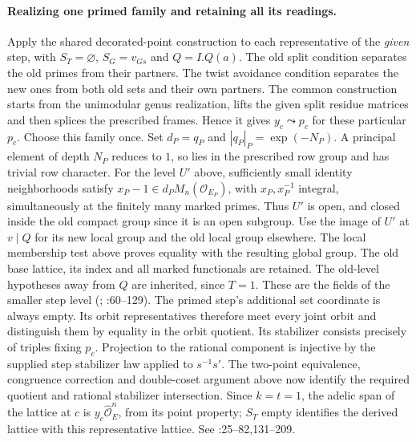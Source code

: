 \paragraph{Realizing one primed family and retaining all its readings.}\label{r13:s9-shrink}
Apply the shared decorated-point construction
 to each representative of the
\emph{given} step, with $S_T=\varnothing$, $S_G=v_{Gs}$ and $Q=I.Q(a)$.
The old split condition separates the old primes from their partners.
The twist avoidance condition separates the new ones from both old
sets and their own partners. The common construction starts from the
unimodular genus realization, lifts the given split residue matrices
and then splices the prescribed frames. Hence it gives
$y_c\leadsto p_c$ for these particular $p_c$. Choose this family once.
Set $d_P=q_P$ and $|q_P|_P=\exp(-N_P)$. A principal element of depth
$N_P$ reduces to $1$, so lies in the prescribed row group and has
trivial row character. For the level $U'$ above, sufficiently small
identity neighborhoods satisfy $x_P-1\in d_PM_n(\mathcal O_{E_P})$,
with $x_P,x_P^{-1}$ integral, simultaneously at the finitely many
marked primes. Thus $U'$ is open, and closed inside the old compact
group since it is an open subgroup. Use the image of $U'$ at $v\mid Q$
for its new local group and the old local group elsewhere. The local
membership test above proves equality with the resulting global group.
The old base lattice, its index and all marked functionals are retained.
The old-level hypotheses away from $Q$ are inherited, since $T=1$.
These are the fields of the smaller step level
(;
:60--129).
The primed step's additional set coordinate is always empty. Its
orbit representatives therefore meet every joint orbit and distinguish
them by equality in the orbit quotient. Its stabilizer consists precisely
of triples fixing $p_c$. Projection to the rational component is
injective by the supplied step stabilizer law applied to $s^{-1}s'$.
The two-point equivalence, congruence correction and double-coset argument
above now identify the required quotient and rational stabilizer
intersection. Since $k=t=1$, the adelic span of the lattice at $c$ is
$y_c\widehat{\mathcal O}_E^n$, from its point property; $S_T$ empty
identifies the derived lattice with this representative lattice.
See :25--82,131--209.

